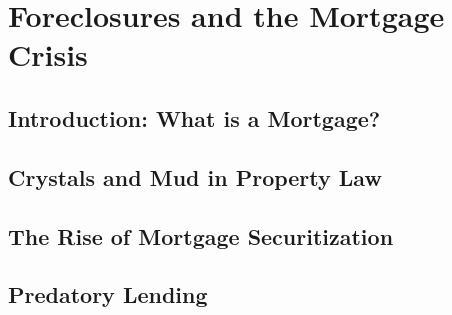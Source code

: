 \chapter{Foreclosures and the Mortgage Crisis}



\section{Introduction: What is a Mortgage?}



\begin{questions}[Problem]

\end{questions}

\section{Crystals and Mud in Property Law}






\begin{questions}

\end{questions}



\section{The Rise of Mortgage Securitization}




\begin{questions}

\end{questions}



\section{Predatory Lending}







\begin{questions}

\end{questions}



